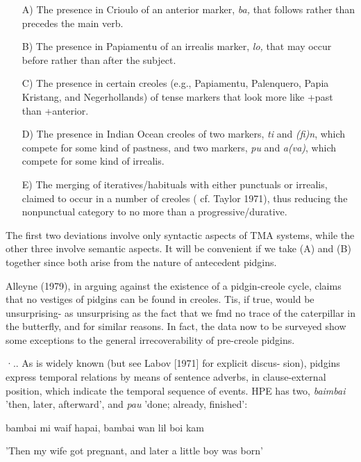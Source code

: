 \begin{itemize}
\item[A)] The presence in Crioulo of an anterior marker, \textit{ba,} that follows rather than precedes the main verb.
\item[B)] The presence in Papiamentu of an irrealis marker, \textit{lo,} that may occur before rather than after the subject.
\item[C)]  The presence in certain creoles (e.g., Papiamentu, Palenquero, Papia Kristang, and Negerhollands) of tense markers that look more like +past than +anterior.
\item[D)] The presence in Indian Ocean creoles of two markers, \textit{ti} and
\textit{(fi)n}, which compete for some kind of pastness, and two
markers, \textit{pu} and \textit{a(va)}, which compete for some kind of irrealis.
\item[E)] The merging of iteratives/habituals with either punctuals or irrealis, claimed to occur in a number of creoles ( cf. Taylor 1971), thus reducing the nonpunctual category to no more than a progressive/durative.
\end{itemize}

The first two deviations involve only syntactic aspects of TMA systems, while the other three involve semantic aspects. It will be convenient if we take (A) and (B) together since both arise from the nature of antecedent pidgins.

Alleyne (1979), in arguing against the existence of a pidgin-creole cycle, claims that no vestiges of pidgins can be found in creoles. Tis, if true, would be unsurprising- as unsurprising as the fact that we fmd no trace of the caterpillar in the butterfly, and for similar reasons. In fact, the data now to be surveyed show some exceptions to the general irrecoverability of pre-creole pidgins.

·.. As is widely known (but see Labov [1971] for explicit discus- sion), pidgins express temporal relations by means of sentence adverbs, in clause-external position, which indicate the temporal sequence of events. HPE has two, \textit{baimbai} 'then, later, afterward', and \textit{pau} 'done; already, finished':

\ea\label{ex:92}
 {bambai} {mi} {waif} {hapai,} {bambai} {wan} {lil} {boi} {kam}
\glt
\z

'Then my wife got pregnant, and later a little boy was born'


